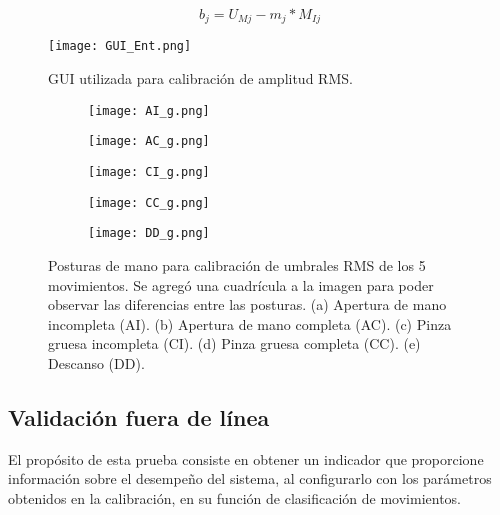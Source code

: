\vfill
\begin{equation}
	b_{j} = U_{Mj} - m_{j}*M_{Ij}
	\label{Ecu: b}
\end{equation}

\vfill
\begin{figure}[htb]
	\centering
	\texttt{[image: GUI\_Ent.png]}
	\caption{GUI utilizada para calibración de amplitud RMS.}
	\label{Figura: GUI_Ent}
\end{figure}

\begin{figure}[htbp]
	\centering
	\begin{subfigure}[htbp]{0.4\textwidth}
		\texttt{[image: AI\_g.png]}
		\caption{}
		\label{Figura: AI}
	\end{subfigure}
	\begin{subfigure}[htbp]{0.4\textwidth}
		\texttt{[image: AC\_g.png]}
		\caption{}
		\label{Figura: AC}
	\end{subfigure}
	\newline
	\begin{subfigure}[htbp]{0.4\textwidth}
		\texttt{[image: CI\_g.png]}
		\caption{}
		\label{Figura: CI}
	\end{subfigure}
	\begin{subfigure}[htbp]{0.4\textwidth}
		\texttt{[image: CC\_g.png]}
		\caption{}
		\label{Figura: CC}
	\end{subfigure}
	\newline
	\begin{subfigure}[htbp]{0.4\textwidth}
		\texttt{[image: DD\_g.png]}
		\caption{}
		\label{Figura: DD}
	\end{subfigure}
	\caption[Posturas de mano para calibración de umbrales RMS]{Posturas de mano para calibración de umbrales RMS de los 5 movimientos. Se agregó una cuadrícula a la imagen para poder observar las diferencias entre las posturas. (a) Apertura de mano incompleta (AI). (b) Apertura de mano completa (AC). (c) Pinza gruesa incompleta (CI). (d) Pinza gruesa completa (CC). (e) Descanso (DD).}
	\label{Figura: Posturas}
\end{figure}

\newpage
\subsection{Validación fuera de línea}
El propósito de esta prueba consiste en obtener un indicador que proporcione información sobre el desempeño del sistema, al configurarlo con los parámetros obtenidos en la calibración, en su función de clasificación de movimientos.

